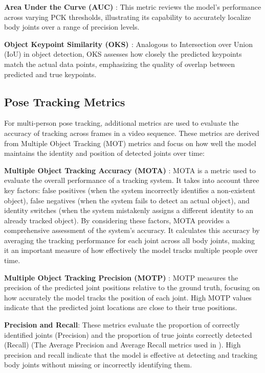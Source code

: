 \textbf{Area Under the Curve (AUC)} \cite{guler2018densepose}: This metric
reviews the model's performance across varying PCK thresholds, illustrating its
capability to accurately localize body joints over a range of precision levels.

\textbf{Object Keypoint Similarity (OKS) \cite{maji2022yolo}}: Analogous to
Intersection over Union (IoU) \cite{rezatofighi2019generalized} in object
detection, OKS assesses how closely the predicted keypoints match the actual
data points, emphasizing the quality of overlap between predicted and true
keypoints.

\subsection{Pose Tracking Metrics}
For multi-person pose tracking, additional metrics are used to evaluate the
accuracy of tracking across frames in a video sequence. These metrics are
derived from Multiple Object Tracking (MOT) metrics \cite{milan2016mot16} and
focus on how well the model maintains the identity and position of detected
joints over time:

\textbf{Multiple Object Tracking Accuracy (MOTA)}
\cite{bernardin2008evaluating}: MOTA is a metric used to evaluate the overall
performance of a tracking system. It takes into account three key factors: false
positives (when the system incorrectly identifies a non-existent object), false
negatives (when the system fails to detect an actual object), and identity
switches (when the system mistakenly assigns a different identity to an already
tracked object). By considering these factors, MOTA provides a comprehensive
assessment of the system's accuracy. It calculates this accuracy by averaging
the tracking performance for each joint across all body joints, making it an
important measure of how effectively the model tracks multiple people over time.

\textbf{Multiple Object Tracking Precision (MOTP)}
\cite{bernardin2008evaluating}: MOTP measures the precision of the predicted
joint positions relative to the ground truth, focusing on how accurately the
model tracks the position of each joint. High MOTP values indicate that the
predicted joint locations are close to their true positions.

\textbf{Precision and Recall}: These metrics evaluate the proportion of
correctly identified joints (Precision) and the proportion of true joints
correctly detected (Recall) (The Average Precision and Average Recall metrics
used in \cite{Chen_2018_CVPR}). High precision and recall indicate that the
model is effective at detecting and tracking body joints without missing or
incorrectly identifying them.

